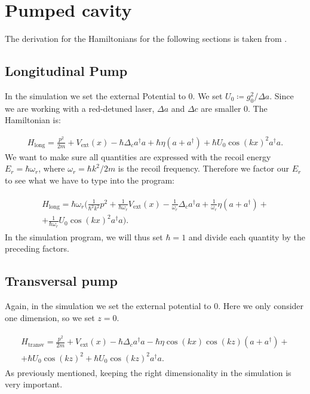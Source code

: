 \section{Pumped cavity}
The derivation for the Hamiltonians for the following sections is taken from \cite{donner}.

\subsection{Longitudinal Pump}
In the simulation we set the external Potential to 0. We set $U_0 \coloneqq g_0^2/\Delta a$. Since we are working with a red-detuned laser, $\Delta a$ and $\Delta c$ are smaller 0. The Hamiltonian is:

\begin{align}
H_\text{long} = \frac{p^2}{2m} + V_\text{ext}(x) - \hbar \Delta_c a^\dagger a + \hbar \eta (a + a^\dagger) + \hbar U_0 \cos(kx)^2 a^\dagger a.
\end{align}We want to make sure all quantities are expressed with the recoil energy $E_r = \hbar \omega_r$, where $\omega_r = \hbar k^2 / 2m$ is the recoil frequency. Therefore we factor our $E_r$ to see what we have to type into the program:

\begin{align}
\begin{split}
H_\text{long} = \hbar \omega_r \biggl( \frac{1}{\hbar^2 k^2} p^2 + \frac{1}{\hbar \omega_r} V_\text{ext}(x) - \frac{1}{\omega_r} \Delta_c a^\dagger a + \frac{1}{\omega_r} \eta (a + a^\dagger) + \\
 + \frac{1}{\hbar \omega_r} U_0 \cos(kx)^2 a^\dagger a \biggr).
\end{split}
\end{align}In the simulation program, we will thus set $\hbar = 1$ and divide each quantity by the preceding factors.

\subsection{Transversal pump}
Again, in the simulation we set the external potential to 0. Here we only consider one dimension, so we set $z=0$.

\begin{align}
\begin{split}
H_\text{transv} = \frac{p^2}{2m} + V_\text{ext}(x) - \hbar \Delta_c a^\dagger a - \hbar \eta \cos(kx) \cos(kz) (a + a^\dagger) + \\
 + \hbar U_0 \cos(kz)^2 + \hbar U_0 \cos(kz)^2 a^\dagger a.
\end{split}
\end{align}As previously mentioned, keeping the right dimensionality in the simulation is very important.

